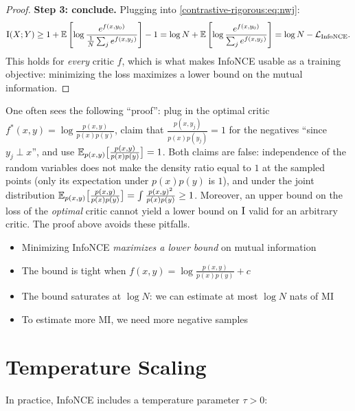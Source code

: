 \begin{notechapter}
\begin{proof}
\textbf{Step 3: conclude.} Plugging into \eqref{contrastive-rigorous:eq:nwj}:
\[
\mathrm{I}(X; Y) \geq 1 + \mathbb{E}\left[\log \frac{e^{f(x, y_0)}}{\frac{1}{N}\sum_{j} e^{f(x, y_j)}}\right] - 1
= \log N + \mathbb{E}\left[\log \frac{e^{f(x, y_0)}}{\sum_{j} e^{f(x, y_j)}}\right]
= \log N - \mathcal{L}_{\text{InfoNCE}} .
\]
This holds for \emph{every} critic $f$, which is what makes InfoNCE usable as a training objective:
minimizing the loss maximizes a lower bound on the mutual information.
\end{proof}

\begin{remark}
One often sees the following ``proof'': plug in the optimal critic $f^*(x,y) = \log \frac{p(x,y)}{p(x)p(y)}$,
claim that $\frac{p(x,y_j)}{p(x)p(y_j)} = 1$ for the negatives ``since $y_j \perp x$'', and use
$\mathbb{E}_{p(x,y)}\big[\frac{p(x,y)}{p(x)p(y)}\big] = 1$. Both claims are false: independence of the random
variables does not make the density ratio equal to $1$ at the sampled points (only its expectation under
$p(x)p(y)$ is $1$), and under the joint distribution $\mathbb{E}_{p(x,y)}\big[\frac{p(x,y)}{p(x)p(y)}\big] =
\int \frac{p(x,y)^2}{p(x)p(y)} \geq 1$. Moreover, an upper bound on the loss of the \emph{optimal} critic cannot
yield a lower bound on $\mathrm{I}$ valid for an arbitrary critic. The proof above avoids these pitfalls.
\end{remark}


\begin{keyresult}
\begin{itemize}
    \item Minimizing InfoNCE \emph{maximizes a lower bound} on mutual information
    \item The bound is tight when $f(x,y) = \log \frac{p(x,y)}{p(x)p(y)} + c$
    \item The bound saturates at $\log N$: we can estimate at most $\log N$ nats of MI
    \item To estimate more MI, we need more negative samples
\end{itemize}
\end{keyresult}

\section{Temperature Scaling}

In practice, InfoNCE includes a temperature parameter $\tau > 0$:


\end{notechapter}
